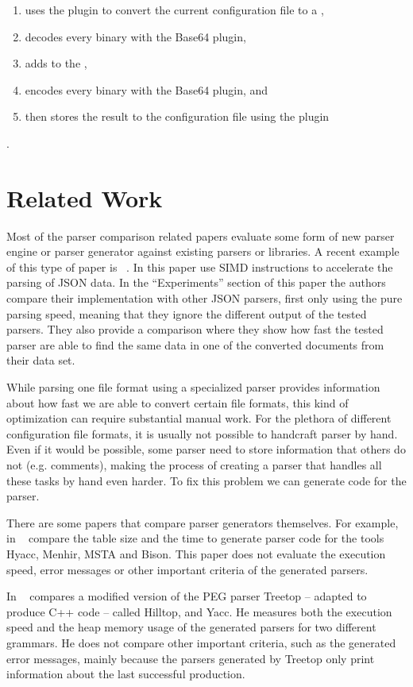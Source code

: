 \begin{enumerate}
  \item uses the  plugin to convert the current  configuration file to a ,
  \item decodes every binary  with the Base64 plugin,
  \item adds  to the ,
  \item encodes every binary  with the Base64 plugin, and
  \item then stores the result to the configuration file using the  plugin
\end{enumerate}

.

\section{Related Work}

Most of the parser comparison related papers evaluate some form of new parser engine or parser generator against existing parsers or libraries. A recent example of this type of paper is ~\cite{json2019geoff}. In this paper \citeauthor{json2019geoff} use \gls{SIMD} instructions to accelerate the parsing of \gls{JSON} data. In the “Experiments” section of this paper the authors compare their implementation with other JSON parsers, first only using the pure parsing speed, meaning that they ignore the different output of the tested parsers. They also provide a comparison where they show how fast the tested parser are able to find the same data in one of the converted documents from their data set.

While parsing one file format using a specialized parser provides information about how fast we are able to convert certain file formats, this kind of optimization can require substantial manual work. For the plethora of different configuration file formats, it is usually not possible to handcraft parser by hand. Even if it would be possible, some parser need to store information that others do not (e.g. comments), making the process of creating a parser that handles all these tasks by hand even harder. To fix this problem we can generate code for the parser.

There are some papers that compare parser generators themselves. For example, in ~\cite{chen2011full} \citeauthor{chen2011full} compare the table size and the time to generate parser code for the tools Hyacc, Menhir, MSTA and Bison. This paper does not evaluate the execution speed, error messages or other important criteria of the generated parsers.

In ~\cite{flodin2014packrat} \citeauthor{flodin2014packrat} compares a modified version of the PEG parser Treetop – adapted to produce C++ code – called Hilltop, and \gls{Yacc}. He measures both the execution speed and the heap memory usage of the generated parsers for two different grammars. He does not compare other important criteria, such as the generated error messages, mainly because the parsers generated by Treetop only print information about the last successful production.
